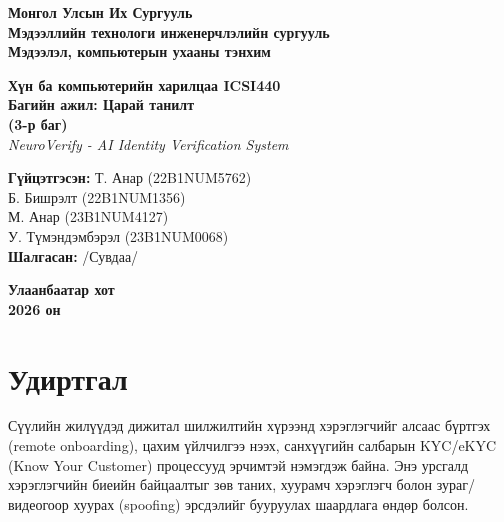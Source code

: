 \documentclass[12pt,a4paper]{article}
\begin{document}
\begin{titlepage}
\begin{center}
\textbf{Монгол Улсын Их Сургууль}\\
\textbf{Мэдээллийн технологи инженерчлэлийн сургууль}\\
\textbf{Мэдээлэл, компьютерын ухааны тэнхим}

\vspace{2.5cm}

{\Large \textbf{Хүн ба компьютерийн харилцаа ICSI440}}\\[1cm]
{\LARGE \textbf{Багийн ажил: Царай танилт}}\\[0.5cm]
{\large \textbf{(3-р баг)}}\\[0.5cm]
{\large \textit{NeuroVerify - AI Identity Verification System}}

\vspace{2.5cm}

\begin{flushleft}
\hspace{2cm}\textbf{Гүйцэтгэсэн:} \dotfill Т. Анар (22B1NUM5762) \\[0.3cm]
\hspace{5.5cm} Б. Бишрэлт (22B1NUM1356) \\[0.3cm]
\hspace{5.5cm} М. Анар (23B1NUM4127)\\[0.3cm]
\hspace{5.5cm} У. Түмэндэмбэрэл (23B1NUM0068) \\[0.8cm]
\hspace{2cm}\textbf{Шалгасан:} \dotfill /Сувдаа/
\end{flushleft}

\vfill

\textbf{Улаанбаатар хот}\\
\textbf{2026 он}
\end{center}
\end{titlepage}

\tableofcontents
\newpage

\section{Удиртгал}

Сүүлийн жилүүдэд дижитал шилжилтийн хүрээнд хэрэглэгчийг алсаас бүртгэх (remote onboarding), цахим үйлчилгээ нээх, санхүүгийн салбарын KYC/eKYC (Know Your Customer) процессууд эрчимтэй нэмэгдэж байна. Энэ урсгалд хэрэглэгчийн биеийн байцаалтыг зөв таних, хуурамч хэрэглэгч болон зураг/видеогоор хуурах (spoofing) эрсдэлийг бууруулах шаардлага өндөр болсон.
\end{document}
